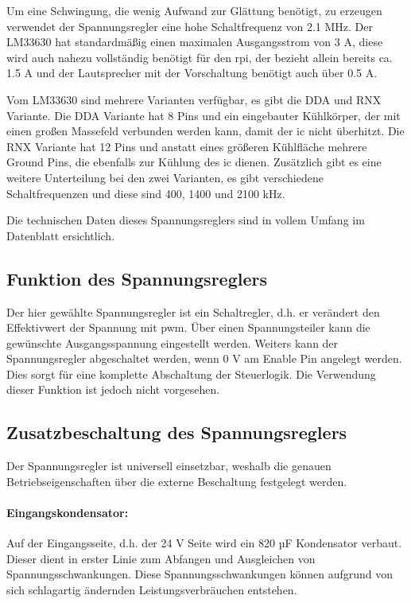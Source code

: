 Um eine Schwingung, die wenig Aufwand zur Glättung benötigt, zu erzeugen verwendet der Spannungsregler eine hohe Schaltfrequenz von 2.1 MHz.
Der LM33630 hat standardmäßig einen maximalen Ausgangsstrom von 3 A, diese wird auch nahezu vollständig benötigt für den \ac{rpi}, der bezieht allein bereits ca. 1.5 A und der Lautsprecher mit der Vorschaltung benötigt auch über 0.5 A.\par

Vom LM33630 sind mehrere Varianten verfügbar, es gibt die DDA und RNX Variante.
Die DDA Variante hat 8 Pins und ein eingebauter Kühlkörper, der mit einen großen Massefeld verbunden werden kann, damit der \ac{ic} nicht überhitzt.
Die RNX Variante hat 12 Pins und anstatt eines größeren Kühlfläche mehrere Ground Pins, die ebenfalls zur Kühlung des \ac{ic} dienen.
Zusätzlich gibt es eine weitere Unterteilung bei den zwei Varianten, es gibt verschiedene Schaltfrequenzen und diese sind 400, 1400 und 2100 kHz.\par
Die technischen Daten dieses Spannungsreglers sind in vollem Umfang im Datenblatt ersichtlich. \cite[vgl.][]{lmr33630-datasheet}

\subsection{Funktion des Spannungsreglers}
Der hier gewählte Spannungsregler ist ein Schaltregler, d.h. er verändert den Effektivwert der Spannung mit \ac{pwm}.
Über einen Spannungsteiler kann die gewünschte Ausgangsspannung eingestellt werden.
Weiters kann der Spannungsregler abgeschaltet werden, wenn 0 V am Enable Pin angelegt werden.
Dies sorgt für eine komplette Abschaltung der Steuerlogik.
Die Verwendung dieser Funktion ist jedoch nicht vorgesehen.

\subsection{Zusatzbeschaltung des Spannungsreglers}
Der Spannungsregler ist universell einsetzbar, weshalb die genauen Betriebseigenschaften über die externe Beschaltung festgelegt werden.
\paragraph{Eingangskondensator:}
Auf der Eingangsseite, d.h. der 24 V Seite wird ein 820 µF Kondensator verbaut.
Dieser dient in erster Linie zum Abfangen und Ausgleichen von Spannungsschwankungen.
Diese Spannungsschwankungen können aufgrund von sich schlagartig ändernden Leistungsverbräuchen entstehen.

